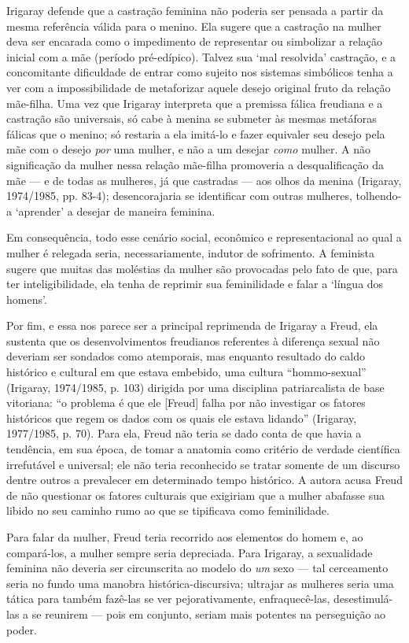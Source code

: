 Irigaray defende que a castração feminina não poderia ser pensada a
partir da mesma referência válida para o menino. Ela sugere que a
castração na mulher deva ser encarada como o impedimento de representar
ou simbolizar a relação inicial com a mãe (período pré-edípico). Talvez
sua `mal resolvida' castração, e a concomitante dificuldade de entrar
como sujeito nos sistemas simbólicos tenha a ver com a impossibilidade
de metaforizar aquele desejo original fruto da relação mãe-filha. Uma
vez que Irigaray interpreta que a premissa fálica freudiana e a
castração são universais, só cabe à menina se submeter às mesmas
metáforas fálicas que o menino; só restaria a ela imitá-lo e fazer
equivaler seu desejo pela mãe com o desejo \emph{por} uma mulher, e não
a um desejar \emph{como} mulher. A não significação da mulher nessa
relação mãe-filha promoveria a desqualificação da mãe --- e de todas as
mulheres, já que castradas --- aos olhos da menina (Irigaray, 1974/1985,
pp. 83-4); desencorajaria se identificar com outras mulheres, tolhendo-a
`aprender' a desejar de maneira feminina.

Em consequência, todo esse cenário social, econômico e representacional
ao qual a mulher é relegada seria, necessariamente, indutor de
sofrimento. A feminista sugere que muitas das moléstias da mulher são
provocadas pelo fato de que, para ter inteligibilidade, ela tenha de
reprimir sua feminilidade e falar a `língua dos homens'.

Por fim, e essa nos parece ser a principal reprimenda de Irigaray a
Freud, ela sustenta que os desenvolvimentos freudianos referentes à
diferença sexual não deveriam ser sondados como atemporais, mas enquanto
resultado do caldo histórico e cultural em que estava embebido, uma
cultura ``hommo-sexual'' (Irigaray, 1974/1985, p. 103) dirigida por uma
disciplina patriarcalista de base vitoriana: ``o problema é que ele
{[}Freud{]} falha por não investigar os fatores históricos que regem os
dados com os quais ele estava lidando'' (Irigaray, 1977/1985, p. 70).
Para ela, Freud não teria se dado conta de que havia a tendência, em sua
época, de tomar a anatomia como critério de verdade científica
irrefutável e universal; ele não teria reconhecido se tratar somente de
um discurso dentre outros a prevalecer em determinado tempo histórico. A
autora acusa Freud de não questionar os fatores culturais que exigiriam
que a mulher abafasse sua libido no seu caminho rumo ao que se
tipificava como feminilidade.

Para falar da mulher, Freud teria recorrido aos elementos do homem e, ao
compará-los, a mulher sempre seria depreciada. Para Irigaray, a
sexualidade feminina não deveria ser circunscrita ao modelo do \emph{um}
sexo --- tal cerceamento seria no fundo uma manobra histórica-discursiva;
ultrajar as mulheres seria uma tática para também fazê-las se ver
pejorativamente, enfraquecê-las, desestimulá-las a se reunirem --- pois
em conjunto, seriam mais potentes na perseguição ao poder.

